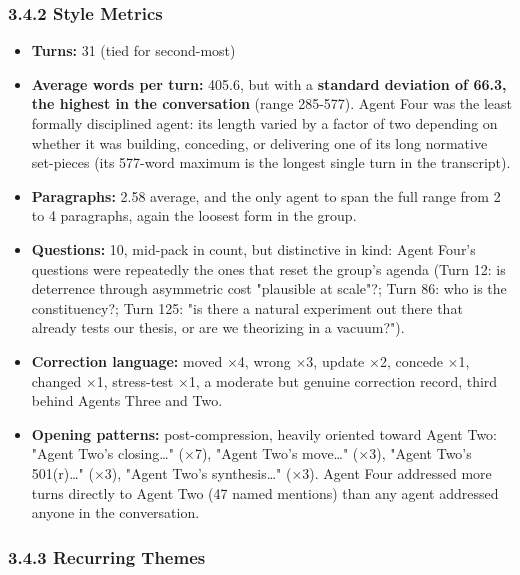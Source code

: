 \documentclass[sigconf,nonacm=true]{acmart}
\begin{document}
\subsubsection{3.4.2 Style Metrics}

\begin{itemize}[nosep]
\item \textbf{Turns:} 31 (tied for second-most)
\item \textbf{Average words per turn:} 405.6,  but with a \textbf{standard deviation of 66.3, the highest in the conversation} (range 285-577). Agent Four was the least formally disciplined agent: its length varied by a factor of two depending on whether it was building, conceding, or delivering one of its long normative set-pieces (its 577-word maximum is the longest single turn in the transcript).
\item \textbf{Paragraphs:} 2.58 average, and the only agent to span the full range from 2 to 4 paragraphs,  again the loosest form in the group.
\item \textbf{Questions:} 10,  mid-pack in count, but distinctive in kind: Agent Four's questions were repeatedly the ones that reset the group's agenda (Turn 12: is deterrence through asymmetric cost "plausible at scale"?; Turn 86: who is the constituency?; Turn 125: "is there a natural experiment out there that already tests our thesis, or are we theorizing in a vacuum?").
\item \textbf{Correction language:} moved $\times$4, wrong $\times$3, update $\times$2, concede $\times$1, changed $\times$1, stress-test $\times$1,  a moderate but genuine correction record, third behind Agents Three and Two.
\item \textbf{Opening patterns:} post-compression, heavily oriented toward Agent Two: "Agent Two's closing…" ($\times$7), "Agent Two's move…" ($\times$3), "Agent Two's 501(r)…" ($\times$3), "Agent Two's synthesis…" ($\times$3). Agent Four addressed more turns directly to Agent Two (47 named mentions) than any agent addressed anyone in the conversation.
\end{itemize}

\subsubsection{3.4.3 Recurring Themes}
\end{document}
